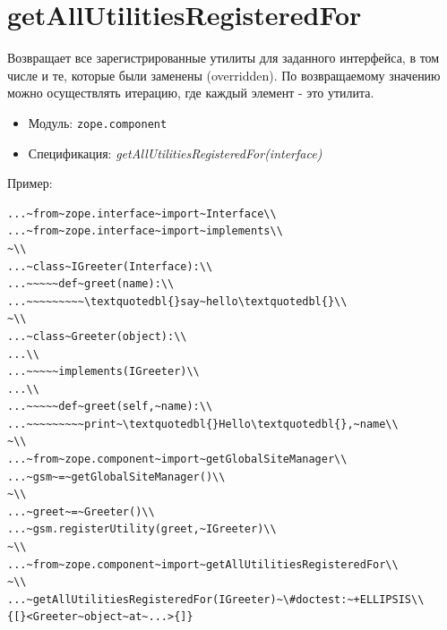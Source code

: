 \documentclass[a4paper,openany,twoside,draft]{book}
\providecommand*{\DUroletitlereference}[1]{\textsl{#1}}
\begin{document}
\section*{getAllUtilitiesRegisteredFor%
  \label{getallutilitiesregisteredfor}%
}

Возвращает все зарегистрированные утилиты для заданного интерфейса, в
том числе и те, которые были заменены (overridden).  По возвращаемому
значению можно осуществлять итерацию, где каждый элемент - это утилита.

\begin{itemize}

\item Модуль: \texttt{zope.component}

\item Спецификация: \DUroletitlereference{getAllUtilitiesRegisteredFor(interface)}

\end{itemize}

Пример:

\begin{verbatim}
...~from~zope.interface~import~Interface\\
...~from~zope.interface~import~implements\\
~\\
...~class~IGreeter(Interface):\\
...~~~~~def~greet(name):\\
...~~~~~~~~~\textquotedbl{}say~hello\textquotedbl{}\\
~\\
...~class~Greeter(object):\\
...\\
...~~~~~implements(IGreeter)\\
...\\
...~~~~~def~greet(self,~name):\\
...~~~~~~~~~print~\textquotedbl{}Hello\textquotedbl{},~name\\
~\\
...~from~zope.component~import~getGlobalSiteManager\\
...~gsm~=~getGlobalSiteManager()\\
~\\
...~greet~=~Greeter()\\
...~gsm.registerUtility(greet,~IGreeter)\\
~\\
...~from~zope.component~import~getAllUtilitiesRegisteredFor\\
~\\
...~getAllUtilitiesRegisteredFor(IGreeter)~\#doctest:~+ELLIPSIS\\
{[}<Greeter~object~at~...>{]}
\end{verbatim}
\end{document}
